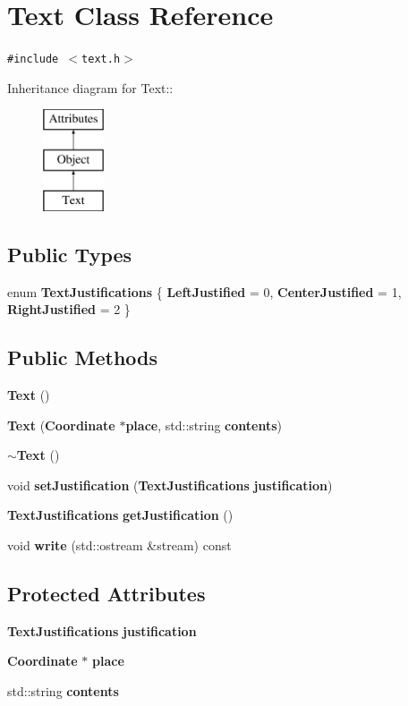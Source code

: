 \section{Text Class Reference}
\label{classText}
{\tt \#include $<$text.h$>$}

Inheritance diagram for Text::\begin{figure}[H]
\begin{center}
\leavevmode
\includegraphics[height=3cm]{classText}
\end{center}
\end{figure}
\subsection*{Public Types}
\begin{CompactItemize}
\item 
enum {\bf Text\-Justifications} \{ {\bf Left\-Justified} =  0, 
{\bf Center\-Justified} =  1, 
{\bf Right\-Justified} =  2
 \}
\end{CompactItemize}
\subsection*{Public Methods}
\begin{CompactItemize}
\item 
{\bf Text} ()
\item 
{\bf Text} ({\bf Coordinate} $\ast${\bf place}, std::string {\bf contents})
\item 
{\bf $\sim$Text} ()
\item 
void {\bf set\-Justification} ({\bf Text\-Justifications} {\bf justification})
\item 
{\bf Text\-Justifications} {\bf get\-Justification} ()
\item 
void {\bf write} (std::ostream \&stream) const
\end{CompactItemize}
\subsection*{Protected Attributes}
\begin{CompactItemize}
\item 
{\bf Text\-Justifications} {\bf justification}
\item 
{\bf Coordinate} $\ast$ {\bf place}
\item 
std::string {\bf contents}
\end{CompactItemize}


